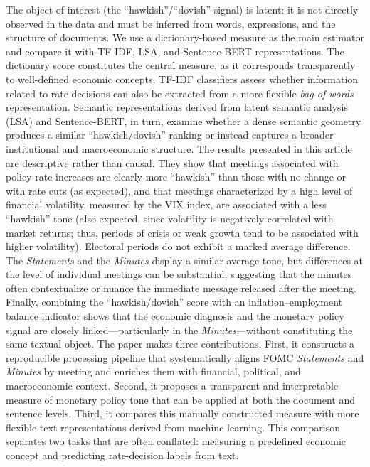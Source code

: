 \documentclass{article}
\begin{document}
The object of interest (the ``hawkish''/``dovish'' signal) is latent: it is not directly observed in the data and must be inferred from words, expressions, and the structure of documents. We use a dictionary-based measure as the 
main estimator and compare it with TF-IDF, LSA, and Sentence-BERT representations. The dictionary score constitutes the central measure, as it corresponds transparently to well-defined economic concepts. 
TF-IDF classifiers assess whether information related to rate decisions can also be extracted from a more flexible \textit{bag-of-words} representation. Semantic representations derived from latent semantic analysis (LSA) 
and Sentence-BERT, in turn, examine whether a dense semantic geometry produces a similar ``hawkish/dovish'' ranking or instead captures a broader institutional and macroeconomic structure.
The results presented in this article are descriptive rather than causal. They show that meetings associated with policy rate increases are clearly more ``hawkish'' than those with no change or with rate cuts (as expected), 
and that meetings characterized by a high level of financial volatility, measured by the VIX index, are associated with a less ``hawkish'' tone (also expected, since volatility is negatively correlated with market returns; thus, 
periods of crisis or weak growth tend to be associated with higher volatility). Electoral periods do not exhibit a marked average difference. The \textit{Statements} and the \textit{Minutes} display a similar average tone, 
but differences at the level of individual meetings can be substantial, suggesting that the minutes often contextualize or nuance the immediate message released after the meeting. Finally, combining the ``hawkish/dovish'' score 
with an inflation--employment balance indicator shows that the economic diagnosis and the monetary policy signal are closely linked—particularly in the \textit{Minutes}—without constituting the same textual object.
The paper makes three contributions. First, it constructs a reproducible processing pipeline that systematically aligns FOMC \textit{Statements} and \textit{Minutes} by meeting and enriches them with financial, 
political, and macroeconomic context. Second, it proposes a transparent and interpretable measure of monetary policy tone that can be applied at both the document and sentence levels. Third, it compares this manually constructed 
measure with more flexible text representations derived from machine learning. This comparison separates two tasks that are often conflated: measuring a predefined economic concept and predicting rate-decision labels from text.
\end{document}
